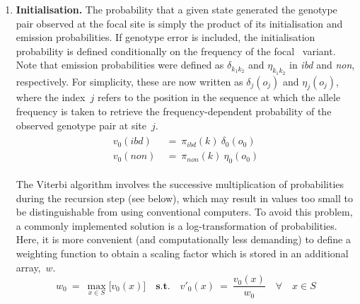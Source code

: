 \begin{enumerate}[label=\textbf{\arabic*.},leftmargin=*]
	\item \textbf{Initialisation.} %
	The probability that a given state generated the genotype pair observed at the focal site is simply the product of its initialisation and emission probabilities.
	If genotype error is included, the initialisation probability is defined conditionally on the frequency of the focal \fk{}~variant.
	Note that emission probabilities were defined as ${\delta_{k_1 k_2}}$ and ${\eta_{k_1 k_2}}$ in \emph{ibd} and \emph{non}, respectively.
	For simplicity, these are now written as ${\delta_j(o_j)}$ and ${\eta_j(o_j)}$, where the index~$j$ refers to the position in the sequence at which the allele frequency is taken to retrieve the frequency-dependent probability of the observed genotype pair at site~$j$.
	\begin{align}
	\begin{aligned}
		v_0(\textit{ibd}) & ~=~ \pi_\textit{ibd}(k) ~ \delta_0(o_0) \\
		v_0(\textit{non}) & ~=~ \pi_\textit{non}(k) ~ \eta_0(o_0)
	\end{aligned}
	\end{align}

	The Viterbi algorithm involves the successive multiplication of probabilities during the recursion step (see below), which may result in values too small to be distinguishable from  using conventional computers.
	To avoid this problem, a commonly implemented solution is a log-transformation of probabilities.
	Here, it is more convenient (and computationally less demanding) to define a weighting function to obtain a scaling factor which is stored in an additional array,~$w$.
	\begin{equation}
		w_0 ~=~ \max_{x \in S} \big[ v_0(x) \big] \quad\textbf{s.t.}\quad
		v'_0(x) ~=~ \frac{v_0(x)}{w_0} \quad \forall \quad x \in S
	\end{equation}


\end{enumerate}
